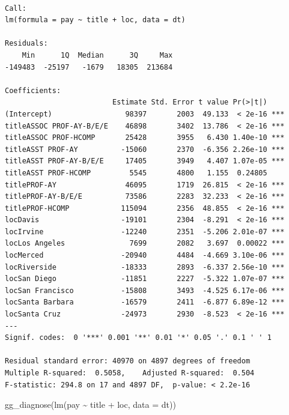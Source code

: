 \documentclass[
  letterpaper,
  DIV=11,
  numbers=noendperiod]{scrreprt}
\newenvironment{Shaded}{\begin{snugshade}}{\end{snugshade}}
\newcommand{\AttributeTok}[1]{\textcolor[rgb]{0.40,0.45,0.13}{#1}}
\newcommand{\FunctionTok}[1]{\textcolor[rgb]{0.28,0.35,0.67}{#1}}
\newcommand{\NormalTok}[1]{\textcolor[rgb]{0.00,0.23,0.31}{#1}}
\newcommand{\SpecialCharTok}[1]{\textcolor[rgb]{0.37,0.37,0.37}{#1}}
\begin{document}
\begin{verbatim}

Call:
lm(formula = pay ~ title + loc, data = dt)

Residuals:
    Min      1Q  Median      3Q     Max 
-149483  -25197   -1679   18305  213684 

Coefficients:
                         Estimate Std. Error t value Pr(>|t|)    
(Intercept)                 98397       2003  49.133  < 2e-16 ***
titleASSOC PROF-AY-B/E/E    46898       3402  13.786  < 2e-16 ***
titleASSOC PROF-HCOMP       25428       3955   6.430 1.40e-10 ***
titleASST PROF-AY          -15060       2370  -6.356 2.26e-10 ***
titleASST PROF-AY-B/E/E     17405       3949   4.407 1.07e-05 ***
titleASST PROF-HCOMP         5545       4800   1.155  0.24805    
titlePROF-AY                46095       1719  26.815  < 2e-16 ***
titlePROF-AY-B/E/E          73586       2283  32.233  < 2e-16 ***
titlePROF-HCOMP            115094       2356  48.855  < 2e-16 ***
locDavis                   -19101       2304  -8.291  < 2e-16 ***
locIrvine                  -12240       2351  -5.206 2.01e-07 ***
locLos Angeles               7699       2082   3.697  0.00022 ***
locMerced                  -20940       4484  -4.669 3.10e-06 ***
locRiverside               -18333       2893  -6.337 2.56e-10 ***
locSan Diego               -11851       2227  -5.322 1.07e-07 ***
locSan Francisco           -15808       3493  -4.525 6.17e-06 ***
locSanta Barbara           -16579       2411  -6.877 6.89e-12 ***
locSanta Cruz              -24973       2930  -8.523  < 2e-16 ***
---
Signif. codes:  0 '***' 0.001 '**' 0.01 '*' 0.05 '.' 0.1 ' ' 1

Residual standard error: 40970 on 4897 degrees of freedom
Multiple R-squared:  0.5058,    Adjusted R-squared:  0.504 
F-statistic: 294.8 on 17 and 4897 DF,  p-value: < 2.2e-16
\end{verbatim}

\begin{Shaded}
\begin{Highlighting}[]
\FunctionTok{gg\_diagnose}\NormalTok{(}\FunctionTok{lm}\NormalTok{(pay }\SpecialCharTok{\textasciitilde{}}\NormalTok{ title }\SpecialCharTok{+}\NormalTok{ loc, }\AttributeTok{data =}\NormalTok{ dt))}
\end{Highlighting}
\end{Shaded}
\end{document}
